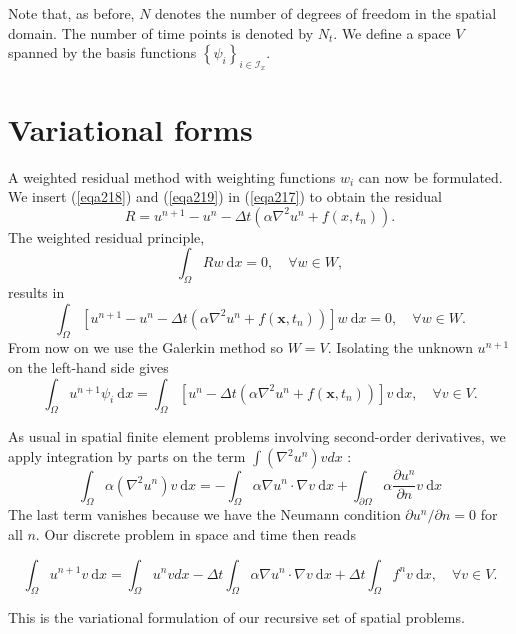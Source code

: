 \documentclass[../main.tex]{subfiles}
\begin{document}
		\noindent Note that, as before, $N$ denotes the number of degrees of freedom in the spatial domain. The number of time points is denoted by $N_{t}$. We define a space $V$ spanned by the basis functions $\left\{\psi_{i}\right\}_{i \in \mathcal{I}_{x}}$. \bigbreak 
	
	\section[Variational forms]{Variational forms}	
	\label{sec:sec_19_2}
		\noindent A weighted residual method with weighting functions $w_{i}$ can now be formulated. We insert (\ref{eqa218}) and (\ref{eqa219}) in (\ref{eqa217}) to obtain the residual
		$$
		R=u^{n+1}-u^{n}-\Delta t\left(\alpha \nabla^{2} u^{n}+f\left(x, t_{n}\right)\right) .
		$$
		The weighted residual principle,
		$$
		\int_{\Omega} R w \mathrm{~d} x=0, \quad \forall w \in W,
		$$
		results in
		$$
		\int_{\Omega}\left[u^{n+1}-u^{n}-\Delta t\left(\alpha \nabla^{2} u^{n}+f\left(\boldsymbol{x}, t_{n}\right)\right)\right] w \mathrm{~d} x=0, \quad \forall w \in W .
		$$
		From now on we use the Galerkin method so $W=V$. Isolating the unknown $u^{n+1}$ on the left-hand side gives
		$$
		\int_{\Omega} u^{n+1} \psi_{i} \mathrm{~d} x=\int_{\Omega}\left[u^{n}-\Delta t\left(\alpha \nabla^{2} u^{n}+f\left(\boldsymbol{x}, t_{n}\right)\right)\right] v \mathrm{~d} x, \quad \forall v \in V .
		$$
		
		As usual in spatial finite element problems involving second-order derivatives, we apply integration by parts on the term $\int\left(\nabla^{2} u^{n}\right) v d x$ :
		$$
		\int_{\Omega} \alpha\left(\nabla^{2} u^{n}\right) v \mathrm{~d} x=-\int_{\Omega} \alpha \nabla u^{n} \cdot \nabla v \mathrm{~d} x+\int_{\partial \Omega} \alpha \frac{\partial u^{n}}{\partial n} v \mathrm{~d} x
		$$
		\noindent The last term vanishes because we have the Neumann condition $\partial u^{n} / \partial n=0$ for all $n$. Our discrete problem in space and time then reads
	
	\begin{equation}
	\label{eqa220}	
		\int_{\Omega} u^{n+1} v \mathrm{~d} x=\int_{\Omega} u^{n} v d x-\Delta t \int_{\Omega} \alpha \nabla u^{n} \cdot \nabla v \mathrm{~d} x+\Delta t \int_{\Omega} f^{n} v \mathrm{~d} x, \quad \forall v \in V .
	\end{equation}

		This is the variational formulation of our recursive set of spatial problems.
		
\end{document}
